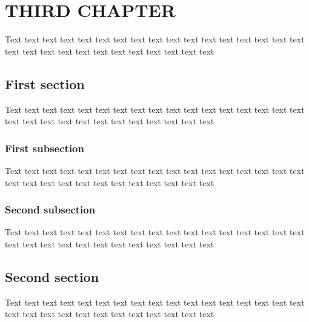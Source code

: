 \chapter{THIRD CHAPTER}
Text text text text text text text text text text text text text text text text text text text text text text text text text text text text text

\section{First section}
Text text text text text text text text text text text text text text text text text text text text text text text text text text text text text

\subsection{First subsection}
Text text text text text text text text text text text text text text text text text text text text text text text text text text text text text

\subsection{Second subsection}
Text text text text text text text text text text text text text text text text text text text text text text text text text text text text text

\section{Second section}
Text text text text text text text text text text text text text text text text text text text text text text text text text text text text text